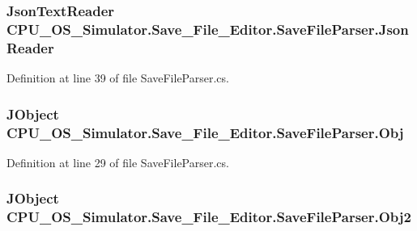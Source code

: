 \subsubsection[{Json\+Reader}]{\setlength{\rightskip}{0pt plus 5cm}Json\+Text\+Reader C\+P\+U\+\_\+\+O\+S\+\_\+\+Simulator.\+Save\+\_\+\+File\+\_\+\+Editor.\+Save\+File\+Parser.\+Json\+Reader\hspace{0.3cm}{\ttfamily [get]}}\label{class_c_p_u___o_s___simulator_1_1_save___file___editor_1_1_save_file_parser_a23df848a9c9f37eac8a163af47c4a490}


Definition at line 39 of file Save\+File\+Parser.\+cs.

\hypertarget{class_c_p_u___o_s___simulator_1_1_save___file___editor_1_1_save_file_parser_ae445d4d00e23566168613a1ce63bb64f}{}
\subsubsection[{Obj}]{\setlength{\rightskip}{0pt plus 5cm}J\+Object C\+P\+U\+\_\+\+O\+S\+\_\+\+Simulator.\+Save\+\_\+\+File\+\_\+\+Editor.\+Save\+File\+Parser.\+Obj\hspace{0.3cm}{\ttfamily [get]}}\label{class_c_p_u___o_s___simulator_1_1_save___file___editor_1_1_save_file_parser_ae445d4d00e23566168613a1ce63bb64f}


Definition at line 29 of file Save\+File\+Parser.\+cs.

\hypertarget{class_c_p_u___o_s___simulator_1_1_save___file___editor_1_1_save_file_parser_a78a64843644849c35b1a35b464e985ef}{}
\subsubsection[{Obj2}]{\setlength{\rightskip}{0pt plus 5cm}J\+Object C\+P\+U\+\_\+\+O\+S\+\_\+\+Simulator.\+Save\+\_\+\+File\+\_\+\+Editor.\+Save\+File\+Parser.\+Obj2\hspace{0.3cm}{\ttfamily [get]}}\label{class_c_p_u___o_s___simulator_1_1_save___file___editor_1_1_save_file_parser_a78a64843644849c35b1a35b464e985ef}


